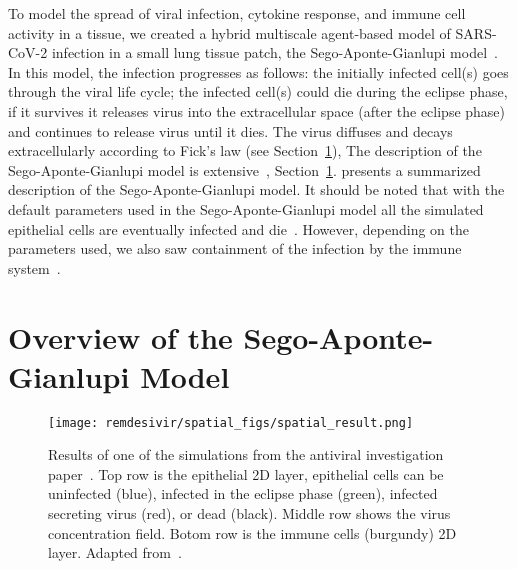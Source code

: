 To model the spread of viral infection, cytokine response, and immune cell activity in a tissue, we created a hybrid multiscale agent-based model of SARS-CoV-2 infection in a small lung tissue patch, the Sego-Aponte-Gianlupi model~\cite{sego_modular_2020}. In this model, the infection progresses as follows: the initially infected cell(s) goes through the viral life cycle; the infected cell(s) could die during the eclipse phase, if it survives it releases virus into the extracellular space (after the eclipse phase) and continues to release virus until it dies. The virus diffuses and decays extracellularly according to Fick's law (see Section~\ref{sec:remdes:met:sego_model}), 
The description of the Sego-Aponte-Gianlupi model is extensive~\cite{sego_modular_2020}, Section~\ref{sec:remdes:met:sego_model}. presents a summarized description of the Sego-Aponte-Gianlupi model. 
It should be noted that with the default parameters used in the Sego-Aponte-Gianlupi model all the simulated epithelial cells are eventually infected and die~\cite{sego_modular_2020}. However, depending on the parameters used, we also saw containment of the infection by the immune system~\cite{sego_modular_2020}.


\section{Overview of the Sego-Aponte-Gianlupi Model}\label{sec:remdes:met:sego_model}

\begin{figure}[H]
     \centering
     \texttt{[image: remdesivir/spatial\_figs/spatial\_result.png]}
     \caption{Results of one of the simulations from the antiviral investigation paper~\cite{ferrari_gianlupi_multiscale_2022}. Top row is the epithelial 2D layer, epithelial cells can be uninfected (blue), infected in the eclipse phase (green), infected secreting virus (red), or dead (black). Middle row shows the virus concentration field. Botom row is the immune cells (burgundy) 2D layer. Adapted from~\cite{ferrari_gianlupi_multiscale_2022}.}
     \label{fig:sego:space-simple}
 \end{figure}

